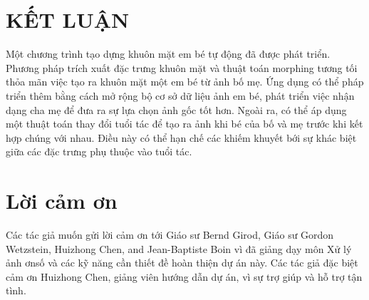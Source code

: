 \documentclass[journal]{IEEEtran}
\begin{document}
\section{KẾT LUẬN}
Một chương trình tạo dựng khuôn mặt em bé tự động đã được phát triển. Phương pháp trích xuất đặc trưng khuôn mặt và thuật toán morphing tương tối thỏa mãn việc tạo ra khuôn mặt một em bé từ ảnh bố mẹ. Ứng dụng có thể pháp triển thêm bằng cách mở rộng bộ cơ sở dữ liệu ảnh em bé, phát triển việc nhận dạng cha mẹ để đưa ra sự lựa chọn ảnh gốc tốt hơn. Ngoài ra, có thể áp dụng một thuật toán thay đổi tuổi tác để tạo ra ảnh khi bé của bố và mẹ trước khi kết hợp chúng với nhau. Điều này có thể hạn chế các khiếm khuyết bới sự khác biệt giữa các đặc trưng phụ thuộc vào tuổi tác.

\section*{Lời cảm ơn}
Các tác giả muốn gửi lời cảm ơn tới Giáo sư Bernd Girod, Giáo sư Gordon Wetzstein, Huizhong Chen, and Jean-Baptiste Boin vì đã giảng dạy môn Xử lý ảnh ơnsố và các kỹ năng cần thiết đề hoàn thiện dự án này. Các tác giả đặc biệt cảm ơn Huizhong Chen, giảng viên hướng dẫn dự án, vì sự trợ giúp và hỗ trợ tận tình.
\end{document}
